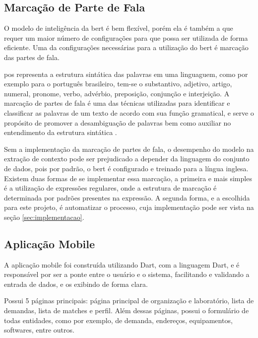 \subsection{Marcação de Parte de Fala}\label{subsec:pos_tagging}

O modelo de inteligência da \gls{bert} é bem flexível, porém ela é também a que requer um maior número de configurações para que possa ser utilizada de forma eficiente. Uma da configurações necessárias para a utilização do \gls{bert} é marcação das partes de fala.

\gls{pos} representa a estrutura sintática das palavras em uma linguaguem, como por exemplo para o português brasileiro, tem-se o substantivo, adjetivo, artigo, numeral, pronome, verbo, advérbio, preposição, conjunção e interjeição. A marcação de partes de fala é uma das técnicas utilizadas para identificar e classificar as palavras de um texto de acordo com sua função gramatical, e serve o propósito de promover a desambiguação de palavras bem como auxiliar no entendimento da estrutura sintática \cite{JurafskyMartin2024}.

Sem a implementação da marcação de partes de fala, o desempenho do modelo na extração de contexto pode ser prejudicado a depender da linguagem do conjunto de dados, pois por padrão, o \gls{bert} é configurado e treinado para a língua inglesa. Existem duas formas de se implementar essa marcação, a primeira e mais simples é a utilização de expressões regulares, onde a estrutura de marcação é determinada por padrões presentes na expressão. A segunda forma, e a escolhida para este projeto, é automatizar o processo, cuja implementação pode ser vista na seção \ref{sec:implementacao}.

\subsection{Aplicação Mobile}\label{subsec:app}

A aplicação mobile foi construída utilizando Dart, com a linguagem Dart, e é responsável por ser a ponte entre o usuário e o sistema, facilitando e validando a entrada de dados, e os exibindo de forma clara.

Possui 5 páginas principais: página principal de organização e laboratório, lista de demandas, lista de matches e perfil. Além dessas páginas, possui o formulário de todas entidades, como por exemplo, de demanda, endereços, equipamentos, softwares, entre outros.
